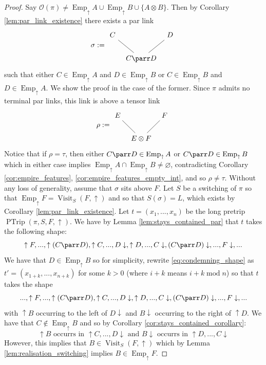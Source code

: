 \documentclass[12pt]{article}
\theoremstyle{plain}
\theoremstyle{definition}
\newcommand{\call}[1]{\mathcal{#1}}
\begin{document}
\begin{proof}
Say $\call{O}(\pi) \neq \operatorname{Emp}_{\uparrow}A \cup \operatorname{Emp}_{\uparrow}B \cup \lbrace A \otimes B\rbrace$. Then by Corollary \ref{lem:par_link_existence} there exists a par link
\[
\sigma := \begin{tikzcd}[column sep = tiny]
C\arrow[dr,dash] && D\arrow[dl,dash]\\
& C \parr D
\end{tikzcd}
\]
such that either $C \in \operatorname{Emp}_{\uparrow}A$ and $D \in \operatorname{Emp}_{\uparrow}B$ or $C \in \operatorname{Emp}_{\uparrow}B$ and $D \in \operatorname{Emp}_{\uparrow}A$. We show the proof in the case of the former. Since $\pi$ admits no terminal par links, this link is above a tensor link
\[
\rho := \begin{tikzcd}[column sep = tiny]
E\arrow[dr,dash] && F\arrow[dl,dash]\\
& E \otimes F
\end{tikzcd}
\]
Notice that if $\rho = \tau$, then either $C \parr D \in \operatorname{Emp}_{\uparrow}A$ or $C \parr D \in \operatorname{Emp}_{\uparrow}B$ which in either case implies $\operatorname{Emp}_{\uparrow}A \cap \operatorname{Emp}_{\uparrow}B \neq \varnothing$, contradicting Corollary \ref{cor:empire_features}, \ref{cor:empire_features_empty_int}, and so $\rho \neq \tau$. Without any loss of generality, assume that $\sigma$ sits above $F$. Let $S$ be a switching of $\pi$ so that $\operatorname{Emp}_{\uparrow}F = \operatorname{Visit}_S(F,\uparrow)$ and so that $S(\sigma) = L$, which exists by Corollary \ref{lem:par_link_existence}. Let $t = (x_1,...,x_n)$ be the long pretrip $\operatorname{PTrip}(\pi,S,F,\uparrow)$. We have by Lemma \ref{lem:stays_contained_par} that $t$ takes the following shape:
\begin{equation}\label{eq:condemning_shape}
    \uparrow F, ..., \uparrow(C \parr D), \uparrow C, ..., D\downarrow, \uparrow D, ..., C\downarrow, (C \parr D)\downarrow, ..., F\downarrow,...
\end{equation}
We have that $D \in \operatorname{Emp}_{\uparrow}B$ so for simplicity, rewrite \eqref{eq:condemning_shape} as $t' = (x_{1 + k},...,x_{n+k})$ for some $k > 0$ (where $i + k$ means $i + k\operatorname{mod} n$) so that $t$ takes the shape
\begin{equation}\label{eq:condemning_shape_altered}
     ..., \uparrow F, ..., \uparrow(C \parr D), \uparrow C, ..., D\downarrow, \uparrow D, ..., C\downarrow, (C \parr D)\downarrow, ..., F\downarrow,...
\end{equation}
with $\uparrow B$ occurring to the left of $D \downarrow$ and $B \downarrow$ occurring to the right of $\uparrow D$.
We have that $C \not\in \operatorname{Emp}_{\uparrow}B$ and so by Corollary \ref{cor:stays_contained_corollary}:
\begin{equation}
\uparrow B \text{ occurrs in }\uparrow C,..., D\downarrow\text{ and } B\downarrow\text{ occurrs in }\uparrow D, ..., C\downarrow
\end{equation}
However, this implies that $B \in \operatorname{Visit}_S(F,\uparrow)$ which by Lemma \ref{lem:realisation_switching} implies $B \in \operatorname{Emp}_{\uparrow}F$.


\end{proof}
\end{document}
